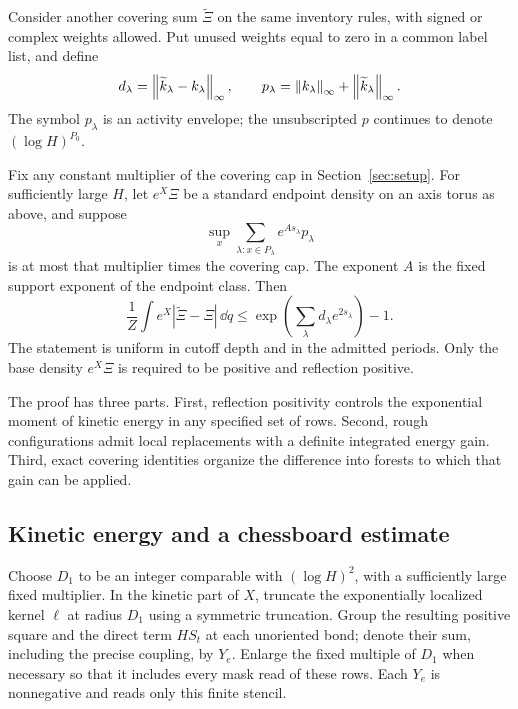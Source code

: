 Consider another covering sum $\widetilde\Xi$ on the same inventory
rules, with signed or complex weights allowed. Put unused weights
equal to zero in a common label list, and define
\[
 d_\lambda=\left\lVert\widetilde k_\lambda-k_\lambda\right\rVert_\infty,
 \qquad
 p_\lambda=\left\lVert k_\lambda\right\rVert_\infty+
                         \left\lVert\widetilde k_\lambda\right\rVert_\infty.
\]
The symbol $p_\lambda$ is an activity envelope; the unsubscripted $p$
continues to denote $(\log H)^{P_0}$.

\begin{proposition}
\label{prop:integrated-comparison}
Fix any constant multiplier of the covering cap in
Section~\ref{sec:setup}. For sufficiently large $H$, let $e^X\Xi$ be
a standard endpoint density on an axis torus as above, and suppose
\[
 \sup_x\sum_{\lambda:x\in P_\lambda}
                     e^{As_\lambda}p_\lambda
\]
is at most that multiplier times the covering cap. The exponent $A$
is the fixed support exponent of the endpoint class. Then
\begin{equation}
 \frac1Z\int e^X|\widetilde\Xi-\Xi|\,\dd q
 \le \exp\left(\sum_\lambda d_\lambda e^{2s_\lambda}\right)-1.
 \label{eq:orig-16}
\end{equation}
The statement is uniform in cutoff depth and in the admitted periods.
Only the base density $e^X\Xi$ is required to be positive and reflection
positive.
\end{proposition}

The proof has three parts. First, reflection positivity controls the
exponential moment of kinetic energy in any specified set of rows.
Second, rough configurations admit local replacements with a definite
integrated energy gain. Third, exact covering identities organize the
difference into forests to which that gain can be applied.

\subsection{Kinetic energy and a chessboard estimate}

Choose $D_1$ to be an integer comparable with $(\log H)^2$, with a
sufficiently large fixed multiplier. In the kinetic part of $X$,
truncate the exponentially localized kernel $\ell$ at radius $D_1$
using a symmetric truncation. Group the resulting positive square
and the direct term $HS_t$ at each unoriented bond; denote their sum,
including the precise coupling, by $Y_e$. Enlarge the fixed multiple
of $D_1$ when necessary so that it includes every mask read of these
rows. Each $Y_e$ is nonnegative and reads only this finite stencil.

